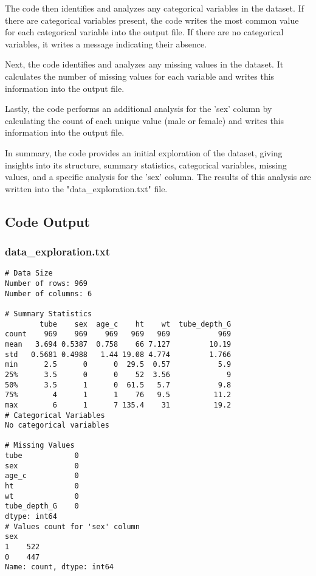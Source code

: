 \documentclass[11pt]{article}
\begin{document}
The code then identifies and analyzes any categorical variables in the dataset. If there are categorical variables present, the code writes the most common value for each categorical variable into the output file. If there are no categorical variables, it writes a message indicating their absence.

Next, the code identifies and analyzes any missing values in the dataset. It calculates the number of missing values for each variable and writes this information into the output file.

Lastly, the code performs an additional analysis for the 'sex' column by calculating the count of each unique value (male or female) and writes this information into the output file.

In summary, the code provides an initial exploration of the dataset, giving insights into its structure, summary statistics, categorical variables, missing values, and a specific analysis for the 'sex' column. The results of this analysis are written into the "data\_exploration.txt" file.

\subsection{Code Output}

\subsubsection*{data\_exploration.txt}

\begin{Verbatim}[tabsize=4]
# Data Size
Number of rows: 969
Number of columns: 6

# Summary Statistics
        tube    sex  age_c    ht    wt  tube_depth_G
count    969    969    969   969   969           969
mean   3.694 0.5387  0.758    66 7.127         10.19
std   0.5681 0.4988   1.44 19.08 4.774         1.766
min      2.5      0      0  29.5  0.57           5.9
25%      3.5      0      0    52  3.56             9
50%      3.5      1      0  61.5   5.7           9.8
75%        4      1      1    76   9.5          11.2
max        6      1      7 135.4    31          19.2
# Categorical Variables
No categorical variables

# Missing Values
tube            0
sex             0
age_c           0
ht              0
wt              0
tube_depth_G    0
dtype: int64
# Values count for 'sex' column
sex
1    522
0    447
Name: count, dtype: int64
\end{Verbatim}
\end{document}
